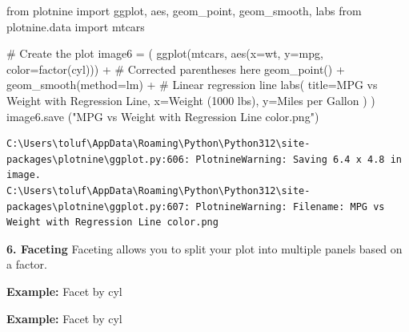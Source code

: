 \documentclass[
  letterpaper,
  DIV=11,
  numbers=noendperiod]{scrreprt}
\newenvironment{Shaded}{\begin{snugshade}}{\end{snugshade}}
\newcommand{\CommentTok}[1]{\textcolor[rgb]{0.37,0.37,0.37}{#1}}
\newcommand{\ImportTok}[1]{\textcolor[rgb]{0.00,0.46,0.62}{#1}}
\newcommand{\NormalTok}[1]{\textcolor[rgb]{0.00,0.23,0.31}{#1}}
\newcommand{\OperatorTok}[1]{\textcolor[rgb]{0.37,0.37,0.37}{#1}}
\newcommand{\StringTok}[1]{\textcolor[rgb]{0.13,0.47,0.30}{#1}}
\begin{document}
\begin{Shaded}
\begin{Highlighting}[]
\ImportTok{from}\NormalTok{ plotnine }\ImportTok{import}\NormalTok{ ggplot, aes, geom\_point, geom\_smooth, labs}
\ImportTok{from}\NormalTok{ plotnine.data }\ImportTok{import}\NormalTok{ mtcars}

\CommentTok{\# Create the plot}
\NormalTok{image6 }\OperatorTok{=}\NormalTok{ (}
\NormalTok{    ggplot(mtcars, aes(x}\OperatorTok{=}\StringTok{\textquotesingle{}wt\textquotesingle{}}\NormalTok{, y}\OperatorTok{=}\StringTok{\textquotesingle{}mpg\textquotesingle{}}\NormalTok{, color}\OperatorTok{=}\StringTok{\textquotesingle{}factor(cyl)\textquotesingle{}}\NormalTok{)) }\OperatorTok{+}  \CommentTok{\# Corrected parentheses here}
\NormalTok{    geom\_point() }\OperatorTok{+}
\NormalTok{    geom\_smooth(method}\OperatorTok{=}\StringTok{\textquotesingle{}lm\textquotesingle{}}\NormalTok{) }\OperatorTok{+}  \CommentTok{\# Linear regression line}
\NormalTok{    labs(}
\NormalTok{        title}\OperatorTok{=}\StringTok{\textquotesingle{}MPG vs Weight with Regression Line\textquotesingle{}}\NormalTok{,}
\NormalTok{        x}\OperatorTok{=}\StringTok{\textquotesingle{}Weight (1000 lbs)\textquotesingle{}}\NormalTok{,}
\NormalTok{        y}\OperatorTok{=}\StringTok{\textquotesingle{}Miles per Gallon\textquotesingle{}}
\NormalTok{    )}
\NormalTok{)}
\NormalTok{image6.save (}\StringTok{"MPG vs Weight with Regression Line color.png"}\NormalTok{)}
\end{Highlighting}
\end{Shaded}

\begin{verbatim}
C:\Users\toluf\AppData\Roaming\Python\Python312\site-packages\plotnine\ggplot.py:606: PlotnineWarning: Saving 6.4 x 4.8 in image.
C:\Users\toluf\AppData\Roaming\Python\Python312\site-packages\plotnine\ggplot.py:607: PlotnineWarning: Filename: MPG vs Weight with Regression Line color.png
\end{verbatim}

\textbf{6. Faceting} Faceting allows you to split your plot into
multiple panels based on a factor.

\textbf{Example:} Facet by cyl

\textbf{Example:} Facet by cyl
\end{document}
